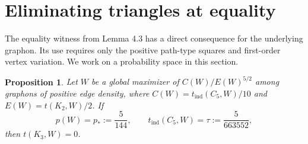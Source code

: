 \documentclass[11pt]{amsart}
\newtheorem{proposition}[theorem]{Proposition}
\theoremstyle{definition}
\theoremstyle{remark}
\begin{document}
\section{Eliminating triangles at equality}
\label{sec:triangles}

The equality witness from Lemma 4.3 has a direct consequence for the
underlying graphon. Its use requires only the positive path-type squares and
first-order vertex variation. We work on a probability space in this section.

\begin{proposition}\label{prop:triangle-elimination}
Let $W$ be a global maximizer of $C(W)/E(W)^{5/2}$ among
graphons of positive edge density, where $C(W)=t_{\mathrm{ind}}(C_5,W)/10$
and $E(W)=t(K_2,W)/2$. If
\[
 p(W)=p_\ast:=\frac5{144},\qquad
 t_{\mathrm{ind}}(C_5,W)=\tau:=\frac5{663552},
\]
then $t(K_3,W)=0$.
\end{proposition}
\end{document}
